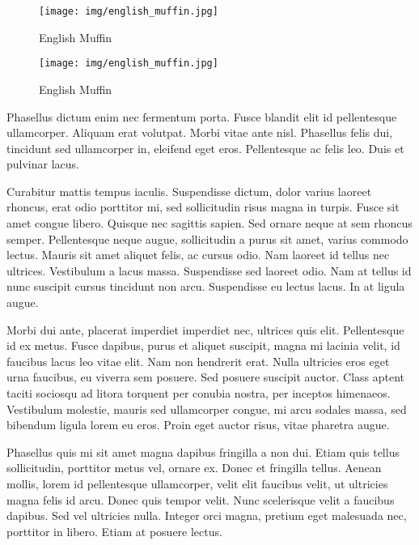\documentclass{llncs}
\begin{document}
\begin{figure}[ht]
\begin{minipage}[b]{0.45\linewidth}
\centering
\texttt{[image: img/english\_muffin.jpg]}
\caption{English Muffin \cite{Muffin:2015}}
\label{fig:figure1}
\end{minipage}
\hspace{0.5cm}
\begin{minipage}[b]{0.45\linewidth}
\centering
\texttt{[image: img/english\_muffin.jpg]}
\caption{English Muffin \cite{Muffin:2015}}
\label{fig:figure2}
\end{minipage}
\end{figure}

Phasellus dictum enim nec fermentum porta. Fusce blandit elit id pellentesque ullamcorper. Aliquam erat volutpat. Morbi vitae ante nisl. Phasellus felis dui, tincidunt sed ullamcorper in, eleifend eget eros. Pellentesque ac felis leo. Duis et pulvinar lacus.

Curabitur mattis tempus iaculis. Suspendisse dictum, dolor varius laoreet rhoncus, erat odio porttitor mi, sed sollicitudin risus magna in turpis. Fusce sit amet congue libero. Quisque nec sagittis sapien. Sed ornare neque at sem rhoncus semper. Pellentesque neque augue, sollicitudin a purus sit amet, varius commodo lectus. Mauris sit amet aliquet felis, ac cursus odio. Nam laoreet id tellus nec ultrices. Vestibulum a lacus massa. Suspendisse sed laoreet odio. Nam at tellus id nunc suscipit cursus tincidunt non arcu. Suspendisse eu lectus lacus. In at ligula augue.

Morbi dui ante, placerat imperdiet imperdiet nec, ultrices quis elit. Pellentesque id ex metus. Fusce dapibus, purus et aliquet suscipit, magna mi lacinia velit, id faucibus lacus leo vitae elit. Nam non hendrerit erat. Nulla ultricies eros eget urna faucibus, eu viverra sem posuere. Sed posuere suscipit auctor. Class aptent taciti sociosqu ad litora torquent per conubia nostra, per inceptos himenaeos. Vestibulum molestie, mauris sed ullamcorper congue, mi arcu sodales massa, sed bibendum ligula lorem eu eros. Proin eget auctor risus, vitae pharetra augue.

Phasellus quis mi sit amet magna dapibus fringilla a non dui. Etiam quis tellus sollicitudin, porttitor metus vel, ornare ex. Donec et fringilla tellus. Aenean mollis, lorem id pellentesque ullamcorper, velit elit faucibus velit, ut ultricies magna felis id arcu. Donec quis tempor velit. Nunc scelerisque velit a faucibus dapibus. Sed vel ultricies nulla. Integer orci magna, pretium eget malesuada nec, porttitor in libero. Etiam at posuere lectus.
\end{document}
